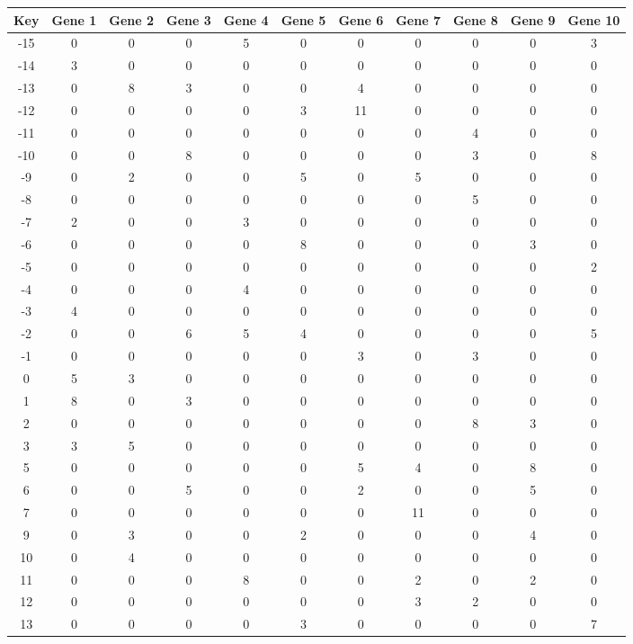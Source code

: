 \begin{tabular}{|c|c|c|c|c|c|c|c|c|c|c|}
\hline
Key & Gene 1 & Gene 2 & Gene 3 & Gene 4 & Gene 5 & Gene 6 & Gene 7 & Gene 8 & Gene 9 & Gene 10 \\
\hline
-15 & 0 & 0 & 0 & 5 & 0 & 0 & 0 & 0 & 0 & 3 \\
-14 & 3 & 0 & 0 & 0 & 0 & 0 & 0 & 0 & 0 & 0 \\
-13 & 0 & 8 & 3 & 0 & 0 & 4 & 0 & 0 & 0 & 0 \\
-12 & 0 & 0 & 0 & 0 & 3 & 11 & 0 & 0 & 0 & 0 \\
-11 & 0 & 0 & 0 & 0 & 0 & 0 & 0 & 4 & 0 & 0 \\
-10 & 0 & 0 & 8 & 0 & 0 & 0 & 0 & 3 & 0 & 8 \\
-9 & 0 & 2 & 0 & 0 & 5 & 0 & 5 & 0 & 0 & 0 \\
-8 & 0 & 0 & 0 & 0 & 0 & 0 & 0 & 5 & 0 & 0 \\
-7 & 2 & 0 & 0 & 3 & 0 & 0 & 0 & 0 & 0 & 0 \\
-6 & 0 & 0 & 0 & 0 & 8 & 0 & 0 & 0 & 3 & 0 \\
-5 & 0 & 0 & 0 & 0 & 0 & 0 & 0 & 0 & 0 & 2 \\
-4 & 0 & 0 & 0 & 4 & 0 & 0 & 0 & 0 & 0 & 0 \\
-3 & 4 & 0 & 0 & 0 & 0 & 0 & 0 & 0 & 0 & 0 \\
-2 & 0 & 0 & 6 & 5 & 4 & 0 & 0 & 0 & 0 & 5 \\
-1 & 0 & 0 & 0 & 0 & 0 & 3 & 0 & 3 & 0 & 0 \\
0 & 5 & 3 & 0 & 0 & 0 & 0 & 0 & 0 & 0 & 0 \\
1 & 8 & 0 & 3 & 0 & 0 & 0 & 0 & 0 & 0 & 0 \\
2 & 0 & 0 & 0 & 0 & 0 & 0 & 0 & 8 & 3 & 0 \\
3 & 3 & 5 & 0 & 0 & 0 & 0 & 0 & 0 & 0 & 0 \\
5 & 0 & 0 & 0 & 0 & 0 & 5 & 4 & 0 & 8 & 0 \\
6 & 0 & 0 & 5 & 0 & 0 & 2 & 0 & 0 & 5 & 0 \\
7 & 0 & 0 & 0 & 0 & 0 & 0 & 11 & 0 & 0 & 0 \\
9 & 0 & 3 & 0 & 0 & 2 & 0 & 0 & 0 & 4 & 0 \\
10 & 0 & 4 & 0 & 0 & 0 & 0 & 0 & 0 & 0 & 0 \\
11 & 0 & 0 & 0 & 8 & 0 & 0 & 2 & 0 & 2 & 0 \\
12 & 0 & 0 & 0 & 0 & 0 & 0 & 3 & 2 & 0 & 0 \\
13 & 0 & 0 & 0 & 0 & 3 & 0 & 0 & 0 & 0 & 7 \\
\hline
\end{tabular}